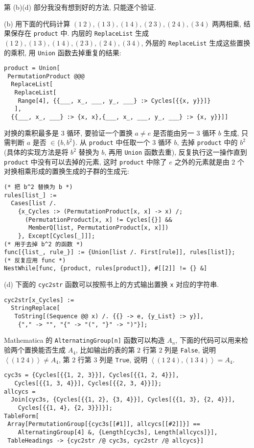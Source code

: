 \documentclass[color=black,device=normal,lang=cn,mode=geye]{elegantnote}
\begin{document}
\begin{note}
    第 (b)(d) 部分我没有想到好的方法, 只能逐个验证.
    
    (b) 用下面的代码计算 $(1\ 2),(1\ 3),(1\ 4),(2\ 3),(2\ 4),(3\ 4)$ 两两相乘, 结果保存在 \verb|product| 中. 内层的 \verb|ReplaceList| 生成 $(1\ 2),(1\ 3),(1\ 4),(2\ 3),(2\ 4),(3\ 4)$, 外层的 \verb|ReplaceList| 生成这些置换的乘积, 用 \verb|Union| 函数去掉重复的结果:
    \begin{lstlisting}
product = Union[
 PermutationProduct @@@
  ReplaceList[
   ReplaceList[
    Range[4], {{___, x_, ___, y_, ___} :> Cycles[{{x, y}}]}
   ],
  {{___, x_, ___} :> {x, x},{___, x_, ___, y_, ___} :> {x, y}}]]
    \end{lstlisting}

    对换的乘积最多是 $3$ 循环, 要验证一个置换 $a\neq e$ 是否能由另一 $3$ 循环 $b$ 生成, 只需判断 $a$ 是否 $\in\{b,b^2\}$. 从 \verb|product| 中任取一个 $3$ 循环 $b$, 去掉 \verb|product| 中的 $b^2$ (具体的实现方法是将 $b^2$ 替换为 $b$, 再用 \verb|Union| 函数去重), 反复执行这一操作直到 \verb|product| 中没有可以去掉的元素, 这时 \verb|product| 中除了 $e$ 之外的元素就是由 $2$ 个对换相乘形成的置换生成的子群的生成元:
    \begin{lstlisting}
(* 把 b^2 替换为 b *)
rules[list_] := 
  Cases[list /.
    {x_Cycles :> (PermutationProduct[x, x] -> x) /;
      (PermutationProduct[x, x] != Cycles[{}] && 
       MemberQ[list, PermutationProduct[x, x]])
    }, Except[Cycles[_]]];
(* 用于去掉 b^2 的函数 *)
func[{list_, rule_}] := {Union[list /. First[rule]], rules[list]};
(* 反复应用 func *)
NestWhile[func, {product, rules[product]}, #[[2]] != {} &]
    \end{lstlisting}

    (d) 下面的 \verb|cyc2str| 函数可以按照书上的方式输出置换 \verb|x| 对应的字符串.
    \begin{lstlisting}
cyc2str[x_Cycles] := 
  StringReplace[
   ToString[(Sequence @@ x) /. {{} -> e, {y_List} :> y}],
    {"," -> "", "{" -> "(", "}" -> ")"}];
    \end{lstlisting}
    
    Mathematica 的 \verb|AlternatingGroup[n]| 函数可以构造 $A_n$, 下面的代码可以用来检验两个置换能否生成 $A_4$, 比如输出的表的第 $2$ 行第 $2$ 列是 \verb|False|, 说明 $\left<(1\ 2\ 4)\right>\neq A_4$, 第 $2$ 行第 $3$ 列是 \verb|True|, 说明 $\left<(1\ 2\ 4),(1\ 3\ 4)\right>=A_4$.
    \begin{lstlisting}
cyc3s = {Cycles[{{1, 2, 3}}], Cycles[{{1, 2, 4}}], 
   Cycles[{{1, 3, 4}}], Cycles[{{2, 3, 4}}]};
allcycs = 
  Join[cyc3s, {Cycles[{{1, 2}, {3, 4}}], Cycles[{{1, 3}, {2, 4}}], 
    Cycles[{{1, 4}, {2, 3}}]}];
TableForm[
 Array[PermutationGroup[{cyc3s[[#1]], allcycs[[#2]]}] == 
    AlternatingGroup[4] &, {Length[cyc3s], Length[allcycs]}], 
 TableHeadings -> {cyc2str /@ cyc3s, cyc2str /@ allcycs}]
    \end{lstlisting}
\end{note}
\end{document}
